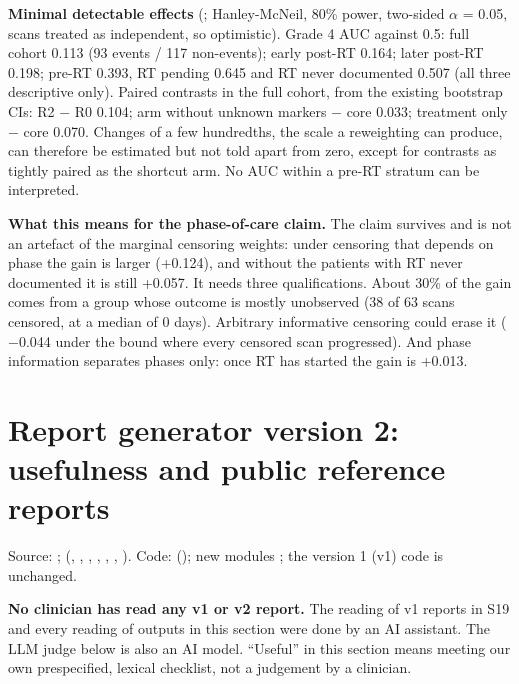 \documentclass[11pt,a4paper]{article}
\begin{document}
\textbf{Minimal detectable effects} (; Hanley-McNeil, 80\% power, two-sided $\alpha$ = 0.05, scans
treated as independent, so optimistic). Grade 4 AUC against 0.5: full cohort 0.113 (93 events / 117 non-events);
early post-RT 0.164; later post-RT 0.198; pre-RT 0.393, RT pending 0.645 and RT never documented 0.507 (all three
descriptive only). Paired contrasts in the full cohort, from the existing bootstrap CIs: R2 $-$ R0 0.104; arm without
unknown markers $-$ core 0.033; treatment only $-$ core 0.070. Changes of a few hundredths, the scale a reweighting can
produce, can therefore be estimated but not told apart from zero, except for contrasts as tightly paired as the
shortcut arm. No AUC within a pre-RT stratum can be interpreted.

\textbf{What this means for the phase-of-care claim.} The claim survives and is not an artefact of the marginal
censoring weights: under censoring that depends on phase the gain is larger (+0.124), and without the patients with RT
never documented it is still +0.057. It needs three qualifications. About 30\% of the gain comes from a group whose
outcome is mostly unobserved (38 of 63 scans censored, at a median of 0 days). Arbitrary informative censoring could
erase it ($-$0.044 under the bound where every censored scan progressed). And phase information separates phases only:
once RT has started the gain is +0.013.

\FloatBarrier
\section{Report generator version 2: usefulness and public reference reports}\label{sec:S21}

Source: ; 
(, , , ,
, , ). Code:
 (); new modules
; the version 1 (v1) code is
unchanged.

\textbf{No clinician has read any v1 or v2 report.} The reading of v1 reports in S19 and every reading of outputs in
this section were done by an AI assistant. The LLM judge below is also an AI model. ``Useful'' in this section means
meeting our own prespecified, lexical checklist, not a judgement by a clinician.
\end{document}
